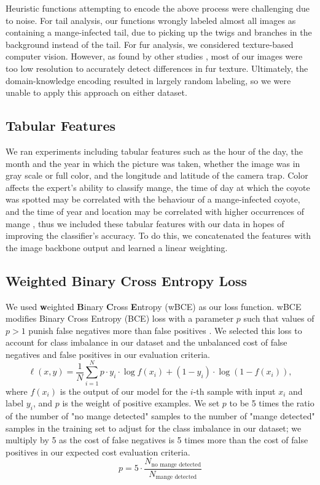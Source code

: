 \documentclass{article}
\begin{document}
Heuristic functions attempting to encode the above process were challenging due to  noise.
For tail analysis, our functions wrongly labeled almost all images as containing a mange-infected tail, due to picking up the twigs and branches in the background instead of the tail. 
For fur analysis, we considered texture-based computer vision. However, as found by other studies \cite{rs15010170}, most of our images were too low resolution to accurately detect differences in fur texture. Ultimately, the domain-knowledge encoding resulted in largely random labeling, so we were unable to apply this approach on either dataset.

\subsection{Tabular Features}
We ran experiments including tabular features such as the hour of the day, the month and the year in which the picture was taken, whether the image was in gray scale or full color, and the longitude and latitude of the camera trap. Color affects the expert's ability to classify mange, the time of day at which the coyote was spotted may be correlated with the behaviour of a mange-infected coyote, and the time of year and location may be correlated with higher occurrences of mange \cite{C469Meeting}, 
thus we included these tabular features with our data in hopes of improving the classifier's accuracy.
To do this, we concatenated the features with the image backbone output and learned a linear weighting.

\subsection{Weighted Binary Cross Entropy Loss}

We used \textbf{w}eighted \textbf{B}inary \textbf{C}ross \textbf{E}ntropy (wBCE) as our loss function. wBCE modifies Binary Cross Entropy (BCE) loss with a parameter $p$ such that values of $p > 1$ punish false negatives more than false positives \cite{Ozdemir2020}. We selected this loss to account for class imbalance in our dataset and the unbalanced cost of false negatives and false positives in our evaluation criteria.
  \begin{equation}
  \ell(x, y) = \frac{1}{N}\sum_{i = 1}^N p \cdot y_i \cdot \log f(x_i)
+ (1 - y_i) \cdot \log (1 - f(x_i)),
\end{equation}
where $f(x_i)$ is the output of our model for the $i$-th sample with input $x_i$
and label $y_i$, and $p$ is the weight of positive examples.
We set $p$ to be 5 times the ratio of the number of "no mange detected" samples to the
number of "mange detected" samples in the training set to adjust for the class
imbalance in our dataset; we multiply by 5 as the cost of false negatives is 5 times more than the cost of false positives in our expected cost evaluation criteria.
\begin{equation}
  p = 5 \cdot \frac{N_{\text{no mange detected}}}{N_{\text{mange detected}}}
\end{equation}
\end{document}
